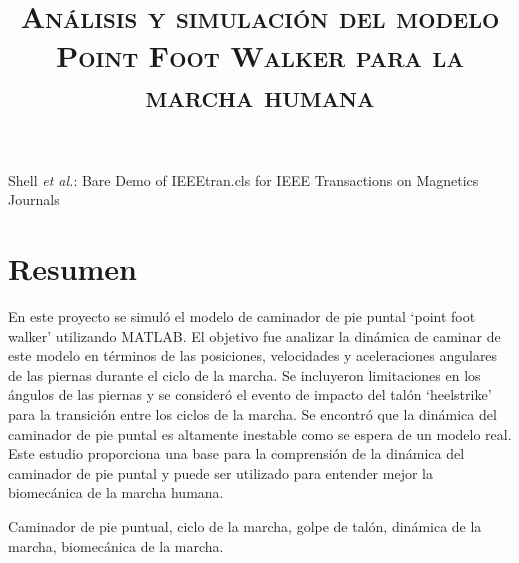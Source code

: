 \documentclass[journal,transmag]{IEEEtran}
\begin{document}
\title{\textsc{Análisis y simulación del modelo Point Foot Walker para la marcha humana}}

\author{


}
%
{Shell \MakeLowercase{\textit{et al.}}: Bare Demo of IEEEtran.cls for IEEE Transactions on Magnetics Journals}


\maketitle
\IEEEdisplaynontitleabstractindextext
\IEEEpeerreviewmaketitle


\section{Resumen}
En este proyecto se simuló el modelo de caminador de pie puntal ‘point foot walker’ utilizando MATLAB. El objetivo fue analizar la dinámica de caminar de este modelo en términos de las posiciones, velocidades y aceleraciones angulares de las piernas durante el ciclo de la marcha. Se incluyeron limitaciones en los ángulos de las piernas y se consideró el evento de impacto del talón ‘heelstrike’ para la transición entre los ciclos de la marcha. Se encontró que la dinámica del caminador de pie puntal es altamente inestable como se espera de un modelo real. Este estudio proporciona una base para la comprensión de la dinámica del caminador de pie puntal y puede ser utilizado para entender mejor la biomecánica de la marcha humana.
\begin{IEEEkeywords}
	Caminador de pie puntual, ciclo de la marcha, golpe de talón, dinámica de la marcha, biomecánica de la marcha.
	 	\end{IEEEkeywords}
\end{document}
